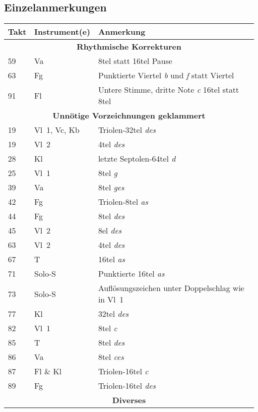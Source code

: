 \documentclass[paper=A3,12pt]{scrartcl}
\newcommand{\note}[1]{\textsl{#1}}
\begin{document}
\subsection{Einzelanmerkungen}

\begin{center}

\begin{tabular}{lll}
\toprule
\textbf{Takt} & \textbf{Instrument(e)} & \textbf{Anmerkung}\\

\midrule
\multicolumn{3}{c}{\textbf{Rhythmische Korrekturen}}\\
\midrule
59 & Va & 8tel statt 16tel Pause\\
63 & Fg & Punktierte Viertel \note{b} und \note{f} statt Viertel\\
91 & Fl & Untere Stimme, dritte Note \note{c} 16tel statt 8tel\\

\midrule
\multicolumn{3}{c}{\textbf{Unnötige Vorzeichnungen geklammert}}\\
\midrule
19 & Vl~1, Vc, Kb & Triolen-32tel \note{des}\\
19 & Vl~2 & 4tel \note{des}\\
28 & Kl & letzte Septolen-64tel \note{d}\\
25 & Vl~1 & 8tel \note{g}\\
39 & Va &  8tel \note{ges}\\
42 & Fg & Triolen-8tel \note{as}\\
44 & Fg & 8tel \note{des}\\
45 & Vl~2 & 8el \note{des}\\
63 & Vl~2 & 4tel \note{des}\\
67 & T & 16tel \note{as}\\
71 & Solo-S & Punktierte 16tel \note{as}\\
73 & Solo-S & Auflösungszeichen unter Doppelschlag wie in Vl~1\\
77 & Kl & 32tel \note{des}\\
82 & Vl~1 & 8tel \note{c}\\
85 & T & 8tel \note{des}\\
86 & Va & 8tel \note{ces}\\
87 & Fl \& Kl & Triolen-16tel \note{c}\\
89 & Fg & Triolen-16tel \note{des}\\

\midrule
\multicolumn{3}{c}{\textbf{Diverses}}\\
\midrule


\end{tabular}
\end{center}
\end{document}
